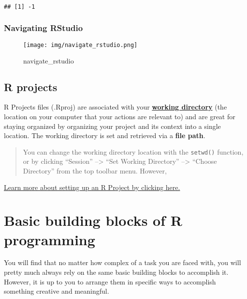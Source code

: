 \documentclass[
]{article}
\begin{document}
\begin{verbatim}
## [1] -1
\end{verbatim}

\hypertarget{navigating-rstudio}{%
\subsubsection{Navigating RStudio}\label{navigating-rstudio}}

\begin{figure}
\centering
\texttt{[image: img/navigate\_rstudio.png]}
\caption{navigate\_rstudio}
\end{figure}

\hypertarget{r-projects}{%
\subsection{R projects}\label{r-projects}}

R Projects files (.Rproj) are associated with your
\href{http://www.sthda.com/english/wiki/running-rstudio-and-setting-up-your-working-directory-easy-r-programming}{\textbf{working
directory}} (the location on your computer that your actions are
relevant to) and are great for staying organized by organizing your
project and its context into a single location. The working directory is
set and retrieved via a \textbf{file path}.

\begin{quote}
You can change the working directory location with the \texttt{setwd()}
function, or by clicking ``Session'' --\textgreater{} ``Set Working
Directory'' --\textgreater{} ``Choose Directory'' from the top toolbar
menu. However,
\end{quote}

\href{https://support.rstudio.com/hc/en-us/articles/200526207-Using-RStudio-Projects}{Learn
more about setting up an R Project by clicking here.}

\hypertarget{basic-building-blocks-of-r-programming}{%
\section{Basic building blocks of R
programming}\label{basic-building-blocks-of-r-programming}}

You will find that no matter how complex of a task you are faced with,
you will pretty much always rely on the same basic building blocks to
accomplish it. However, it is up to you to arrange them in specific ways
to accomplish something creative and meaningful.
\end{document}
